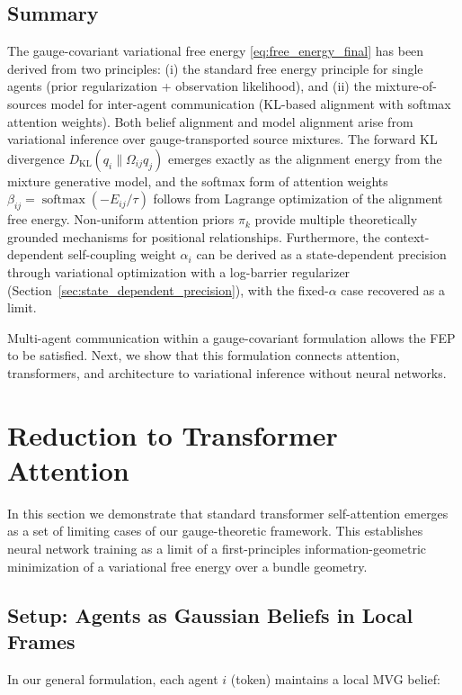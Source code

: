 \documentclass[twoside,11pt]{article}
\begin{document}
\subsection{Summary}

The gauge-covariant variational free energy \eqref{eq:free_energy_final} has been derived from two principles: (i) the standard free energy principle for single agents (prior regularization + observation likelihood), and (ii) the mixture-of-sources model for inter-agent communication (KL-based alignment with softmax attention weights). Both belief alignment and model alignment arise from variational inference over gauge-transported source mixtures. The forward KL divergence $D_{\mathrm{KL}}(q_i \| \Omega_{ij}q_j)$ emerges exactly as the alignment energy from the mixture generative model, and the softmax form of attention weights $\beta_{ij} = \operatorname{softmax}(-E_{ij}/\tau)$ follows from Lagrange optimization of the alignment free energy. Non-uniform attention priors $\pi_k$ provide multiple theoretically grounded mechanisms for positional relationships. Furthermore, the context-dependent self-coupling weight $\alpha_i$ can be derived as a state-dependent precision through variational optimization with a log-barrier regularizer (Section~\ref{sec:state_dependent_precision}), with the fixed-$\alpha$ case recovered as a limit.

Multi-agent communication within a gauge-covariant formulation allows the FEP to be satisfied. Next, we show that this formulation connects attention, transformers, and architecture to variational inference without neural networks.

\section{Reduction to Transformer Attention}

In this section we demonstrate that standard transformer self-attention emerges as a set of limiting cases of our gauge-theoretic framework. This establishes neural network training as a limit of a first-principles information-geometric minimization of a variational free energy over a bundle geometry.

\subsection{Setup: Agents as Gaussian Beliefs in Local Frames}

In our general formulation, each agent $i$ (token) maintains a local MVG belief:
\end{document}
